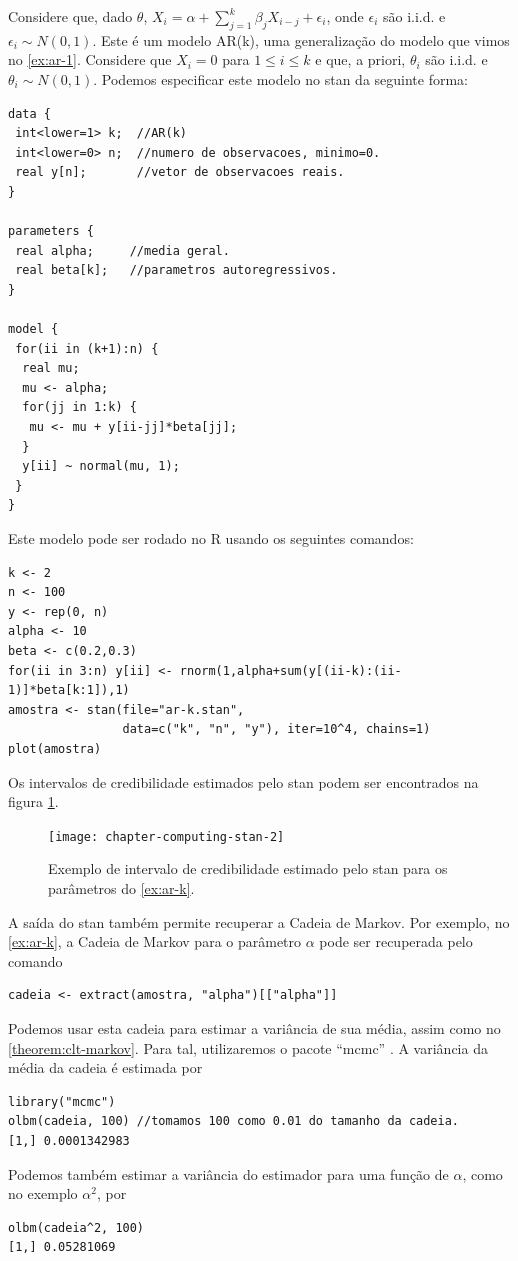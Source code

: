 \cprotEnv \begin{example}
 \label{ex:ar-k}
 Considere que, dado $\theta$, 
 $X_{i}= \alpha + \sum_{j=1}^{k}{\beta_{j}X_{i-j}} + \epsilon_{i}$,
 onde $\epsilon_{i}$ são i.i.d. e $\epsilon_{i} \sim N(0,1)$.
 Este é um modelo AR(k), 
 uma generalização do modelo que vimos no \cref{ex:ar-1}.
 Considere que $X_{i}=0$ para $1 \leq i \leq k$ e que, a priori,
 $\theta_{i}$ são i.i.d. e $\theta_{i} \sim N(0,1)$.
 Podemos especificar este modelo no stan da seguinte forma:
 \begin{verbatim}
data {
 int<lower=1> k;  //AR(k)
 int<lower=0> n;  //numero de observacoes, minimo=0.
 real y[n];       //vetor de observacoes reais.
}

parameters {
 real alpha;     //media geral.
 real beta[k];   //parametros autoregressivos.
}

model {
 for(ii in (k+1):n) {
  real mu;
  mu <- alpha;
  for(jj in 1:k) {
   mu <- mu + y[ii-jj]*beta[jj];
  }
  y[ii] ~ normal(mu, 1);
 }
}
 \end{verbatim}
 Este modelo pode ser rodado no R usando os seguintes comandos:
\begin{verbatim}
k <- 2
n <- 100
y <- rep(0, n)
alpha <- 10
beta <- c(0.2,0.3)
for(ii in 3:n) y[ii] <- rnorm(1,alpha+sum(y[(ii-k):(ii-1)]*beta[k:1]),1)
amostra <- stan(file="ar-k.stan", 
                data=c("k", "n", "y"), iter=10^4, chains=1)
plot(amostra)
\end{verbatim}
Os intervalos de credibilidade estimados pelo stan
podem ser encontrados na figura \ref{fig:stan-2}.
\begin{figure}
 \centering
 \texttt{[image: chapter-computing-stan-2]}
 \caption{Exemplo de intervalo de credibilidade estimado pelo stan
          para os parâmetros do \cref{ex:ar-k}.}
 \label{fig:stan-2}
\end{figure}
\end{example}

A saída do stan também permite recuperar a Cadeia de Markov.
Por exemplo, no \cref{ex:ar-k}, a Cadeia de Markov para o parâmetro $\alpha$
pode ser recuperada pelo comando
\begin{verbatim}
cadeia <- extract(amostra, "alpha")[["alpha"]]
\end{verbatim}
Podemos usar esta cadeia para estimar a variância de sua média,
assim como no \cref{theorem:clt-markov}.
Para tal, utilizaremos o pacote ``mcmc'' \citep{Geyer2015}.
A variância da média da cadeia é estimada por
\begin{verbatim}
library("mcmc")
olbm(cadeia, 100) //tomamos 100 como 0.01 do tamanho da cadeia.
[1,] 0.0001342983
\end{verbatim}
Podemos também estimar a variância do estimador
para uma função de $\alpha$, como no exemplo $\alpha^{2}$, por
\begin{verbatim}
olbm(cadeia^2, 100)
[1,] 0.05281069
\end{verbatim}

